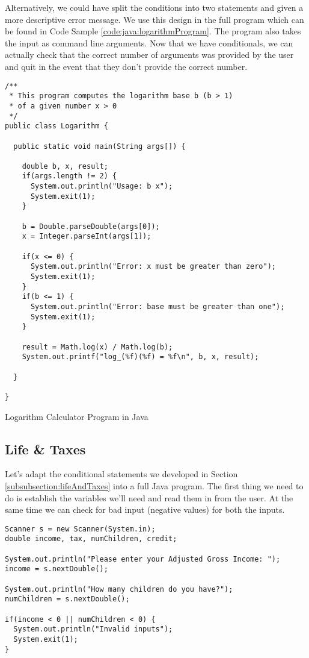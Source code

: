 Alternatively, we could have split the conditions into two statements and given
a more descriptive error message.  We use this design in the full program 
which can be found in Code Sample \ref{code:java:logarithmProgram}.  The 
program also takes the input as command line arguments.  Now that we have
conditionals, we can actually check that the correct number of arguments
was provided by the user and quit in the event that they don't provide
the correct number.

\begin{listing}[h]
\begin{verbatim}
/**
 * This program computes the logarithm base b (b > 1) 
 * of a given number x > 0
 */
public class Logarithm {

  public static void main(String args[]) {

    double b, x, result;
    if(args.length != 2) {
      System.out.println("Usage: b x");
      System.exit(1);
    }  
	  
    b = Double.parseDouble(args[0]);
    x = Integer.parseInt(args[1]);

    if(x <= 0) {
      System.out.println("Error: x must be greater than zero");
      System.exit(1);
    }
    if(b <= 1) {
      System.out.println("Error: base must be greater than one");
      System.exit(1);
    }

    result = Math.log(x) / Math.log(b);
    System.out.printf("log_(%f)(%f) = %f\n", b, x, result);

  }

}
\end{verbatim}
\caption{Logarithm Calculator Program in Java}
\label{code:java:logarithmProgram}
\end{listing}

\subsection{Life \& Taxes}

Let's adapt the conditional statements we developed in Section \ref{subsubsection:lifeAndTaxes}
into a full Java program.  The first thing we need to do is establish the variables we'll need and
read them in from the user.  At the same time we can check for bad input (negative values)
for both the inputs.

\begin{verbatim}
Scanner s = new Scanner(System.in);
double income, tax, numChildren, credit;

System.out.println("Please enter your Adjusted Gross Income: ");
income = s.nextDouble();

System.out.println("How many children do you have?");
numChildren = s.nextDouble();

if(income < 0 || numChildren < 0) {
  System.out.println("Invalid inputs");   
  System.exit(1);
}
\end{verbatim}

